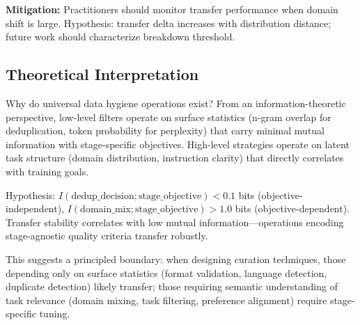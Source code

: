 \textbf{Mitigation:} Practitioners should monitor transfer performance when domain shift is large. Hypothesis: transfer delta increases with distribution distance; future work should characterize breakdown threshold.

\subsection{Theoretical Interpretation}

Why do universal data hygiene operations exist? From an information-theoretic perspective, low-level filters operate on surface statistics (n-gram overlap for deduplication, token probability for perplexity) that carry minimal mutual information with stage-specific objectives. High-level strategies operate on latent task structure (domain distribution, instruction clarity) that directly correlates with training goals.

Hypothesis: $I(\text{dedup\_decision}; \text{stage\_objective}) < 0.1$ bits (objective-independent), $I(\text{domain\_mix}; \text{stage\_objective}) > 1.0$ bits (objective-dependent). Transfer stability correlates with low mutual information—operations encoding stage-agnostic quality criteria transfer robustly.

This suggests a principled boundary: when designing curation techniques, those depending only on surface statistics (format validation, language detection, duplicate detection) likely transfer; those requiring semantic understanding of task relevance (domain mixing, task filtering, preference alignment) require stage-specific tuning.
